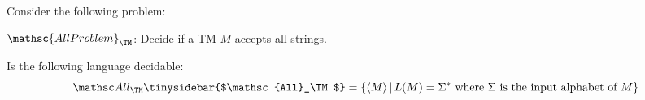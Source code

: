   Consider the following problem:

  $\mathsc{AllProblem}_\TM$:
  Decide if a TM $M$ accepts all strings.
  
Is the following language decidable:
\[
\ALL_\TM\tinysidebar{$\mathsc{All}_\TM$}\index{all$\mathsc{All}_\TM$}
= \{ \langle M \rangle  \,|\, L(M) = \Sigma^*
\text{ where $\Sigma$ is the input alphabet of $M$} \}
\]
